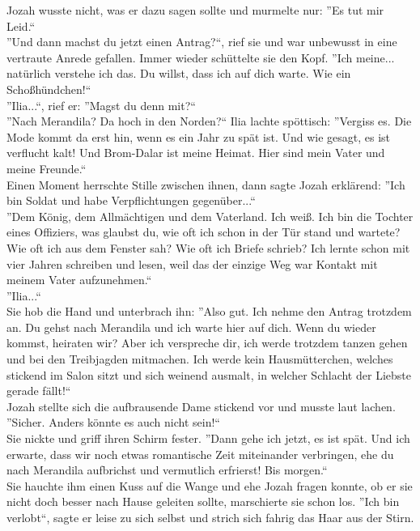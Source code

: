 Jozah wusste nicht, was er dazu sagen sollte und murmelte nur: ''Es tut mir Leid.``\\
''Und dann machst du jetzt einen Antrag?``, rief sie und war unbewusst in eine vertraute Anrede 
gefallen. Immer wieder schüttelte sie den Kopf. ''Ich meine... natürlich verstehe ich das. Du 
willst, dass ich auf dich warte. Wie ein Schoßhündchen!``\\
''Ilia...``, rief er: ''Magst du denn mit?``\\
''Nach Merandila? Da hoch in den Norden?`` Ilia lachte spöttisch: ''Vergiss es. Die Mode kommt da 
erst hin, wenn es ein Jahr zu spät ist. Und wie gesagt, es ist verflucht kalt! Und Brom-Dalar ist 
meine Heimat. Hier sind mein Vater und meine Freunde.``\\
Einen Moment herrschte Stille zwischen ihnen, dann sagte Jozah erklärend: ''Ich bin Soldat und habe 
Verpflichtungen gegenüber...``\\
''Dem König, dem Allmächtigen und dem Vaterland. Ich weiß. Ich bin die Tochter eines Offiziers, was 
glaubst du, wie oft ich schon in der Tür stand und wartete? Wie oft ich aus dem Fenster sah? Wie 
oft ich Briefe schrieb? Ich lernte schon mit vier Jahren schreiben und lesen, weil das der einzige 
Weg war Kontakt mit meinem Vater aufzunehmen.``\\
''Ilia...``\\
Sie hob die Hand und unterbrach ihn: ''Also gut. Ich nehme den Antrag trotzdem an. Du gehst nach 
Merandila und ich warte hier auf dich. Wenn du wieder kommst, heiraten wir? Aber ich verspreche 
dir, ich werde trotzdem tanzen gehen und bei den Treibjagden mitmachen. Ich werde kein 
Hausmütterchen, welches stickend im Salon sitzt und sich weinend ausmalt, in welcher Schlacht der 
Liebste gerade fällt!``\\
Jozah stellte sich die aufbrausende Dame stickend vor und musste laut lachen. ''Sicher. Anders 
könnte es auch nicht sein!``\\
Sie nickte und griff ihren Schirm fester. ''Dann gehe ich jetzt, es ist spät. Und ich erwarte, dass 
wir noch etwas romantische Zeit miteinander verbringen, ehe du nach Merandila aufbrichst und 
vermutlich erfrierst! Bis morgen.``\\
Sie hauchte ihm einen Kuss auf die Wange und ehe Jozah fragen konnte, ob er sie nicht doch besser 
nach Hause geleiten sollte, marschierte sie schon los. 
''Ich bin verlobt``, sagte er leise zu sich selbst und strich sich fahrig das Haar aus der Stirn.\\


